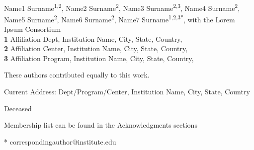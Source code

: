 \documentclass[
  10pt,
  letterpaper,
]{article}
\begin{document}
\vspace*{0.2in}

\begin{flushleft}
{\Large
\textbf{} %
}
\newline
\\
Name1 Surname\textsuperscript{1,2\Yinyang}, Name2
Surname\textsuperscript{2\Yinyang}, Name3
Surname\textsuperscript{2,3}, Name4 Surname\textsuperscript{2}, Name5
Surname\textsuperscript{2\dag}, Name6 Surname\textsuperscript{2}, Name7
Surname\textsuperscript{1,2,3*}, with the Lorem Ipsum
Consortium\textsuperscript{\textpilcrow}
\\
\bigskip
\textbf{1} Affiliation Dept, Institution
Name, City, State, Country, \\ \textbf{2} Affiliation Center,
Institution Name, City, State, Country, \\ \textbf{3} Affiliation
Program, Institution Name, City, State, Country, 
\bigskip

% 
%
\Yinyang These authors contributed equally to this work.


\textcurrency Current Address: Dept/Program/Center, Institution Name, City, State, Country %

\dag Deceased

\textpilcrow Membership list can be found in the Acknowledgments
sections

* correspondingauthor@institute.edu

\end{flushleft}
\end{document}
